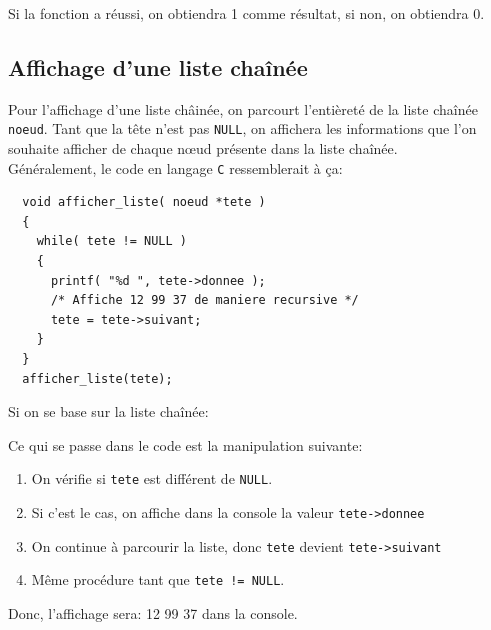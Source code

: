 \documentclass[11pt]{article}
\begin{document}
Si la fonction a réussi, on obtiendra 1 comme résultat, si non, on obtiendra 0.

\subsection{Affichage d'une liste chaînée}

Pour l'affichage d'une liste châinée, on parcourt l'entièreté de la liste chaînée \texttt{noeud}. Tant que la tête n'est pas \texttt{NULL}, on affichera les informations que l'on souhaite afficher de chaque n\oe{}ud présente dans la liste chaînée.\\
Généralement, le code en langage \texttt{C} ressemblerait à ça:
\begin{lstlisting}
  void afficher_liste( noeud *tete )
  {
    while( tete != NULL )
    {
      printf( "%d ", tete->donnee );
      /* Affiche 12 99 37 de maniere recursive */
      tete = tete->suivant;
    }
  }
  afficher_liste(tete);
\end{lstlisting}

Si on se base sur la liste chaînée:

Ce qui se passe dans le code est la manipulation suivante:
\begin{enumerate}
\item On vérifie si \texttt{tete} est différent de \texttt{NULL}.
\item Si c'est le cas, on affiche dans la console la valeur \texttt{tete->donnee}
\item On continue à parcourir la liste, donc \texttt{tete} devient \texttt{tete->suivant}
\item Même procédure tant que \texttt{tete != NULL}.
\end{enumerate}

Donc, l'affichage sera: 12 99 37 dans la console.
\end{document}
